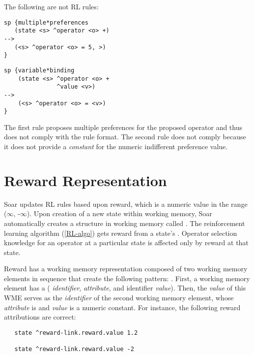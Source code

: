 The following are not RL rules:

\begin{verbatim}
sp {multiple*preferences
   (state <s> ^operator <o> +)
-->
   (<s> ^operator <o> = 5, >)
}
\end{verbatim}  \vspace{12pt}

\begin{verbatim}
sp {variable*binding
    (state <s> ^operator <o> +
               ^value <v>)
-->
    (<s> ^operator <o> = <v>)
}
\end{verbatim}  \vspace{12pt}

The first rule proposes multiple preferences for the proposed operator and thus does not comply with the rule format.
The second rule does not comply because it does not provide a \emph{constant} for the numeric indifferent preference value.

\section{Reward Representation}
\label{RL-reward}

Soar updates RL rules based upon reward, which is a numeric value in the range ($\infty$, -$\infty$).
Upon creation of a new state within working memory, Soar automatically creates a structure in working memory called .
The reinforcement learning algorithm (\ref{RL-algo}) gets reward from a state's .
Operator selection knowledge for an operator at a particular state is affected only by reward at that state.

Reward has a working memory representation composed of two working memory elements in sequence that create the following pattern: .
First, a working memory element has a ( \emph{identifier},  \emph{attribute}, and identifier \emph{value}).
Then, the \emph{value} of this WME serves as the \emph{identifier} of the second working memory element, whose \emph{attribute} is  and \emph{value} is a numeric constant.
For instance, the following reward attributions are correct:

\begin{verbatim}
   state ^reward-link.reward.value 1.2
   
   state ^reward-link.reward.value -2
\end{verbatim}  

